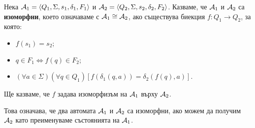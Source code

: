 \begin{dfn}
  Нека $\mathcal{A}_1 = \langle{Q_1,\Sigma,s_1,\delta_1,F_1}\rangle$ и $\mathcal{A}_2 = \langle{Q_2,\Sigma,s_2,\delta_2,F_2}\rangle$.
  Казваме, че $\mathcal{A}_1$ и $\mathcal{A}_2$ са {\bf изоморфни}, което означаваме с $\mathcal{A}_1 \cong \mathcal{A}_2$, ако
  съществува биекция $f: Q_1\to Q_2$, за която:
  \begin{itemize}
  \item
    $f(s_1) = s_2$;
  \item
    $q \in F_1 \iff f(q) \in F_2$;
  \item
    $(\forall a\in\Sigma)(\forall q\in Q_1)[f(\delta_1(q,a)) = \delta_2(f(q),a)]$.
  \end{itemize}
  Ще казваме, че $f$ задава изоморфизъм на $\mathcal{A}_1$ върху $\mathcal{A}_2$.
\end{dfn}

Това означава, че два автомата $\mathcal{A}_1$ и $\mathcal{A}_2$ са изоморфни, ако можем да получим $\mathcal{A}_2$
като преименуваме състоянията на $\mathcal{A}_1$.

